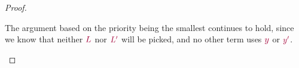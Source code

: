 \begin{proof}
\begin{enumerate}
\begin{enumerate}
      The argument based on the priority being the smallest continues to hold, since we know that neither $\tm{L}$ nor $\tm{L'}$ will be picked, and no other term uses $\tm{y}$ or $\tm{y'}$.
    \end{enumerate}
  \end{enumerate}
\end{proof}

